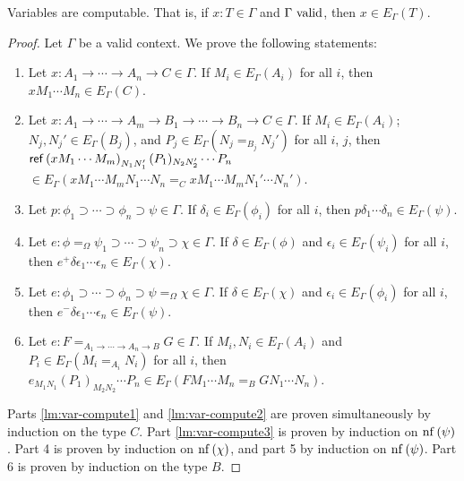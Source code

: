 \begin{lm}
\label{lm:var-compute}
Variables are computable.  That is, if $x : T \in \Gamma$ and $\Gamma \ \mathrm{valid}$, then $x \in E_\Gamma(T)$.
\end{lm}

\begin{proof}
Let $\Gamma$ be a valid context.
We prove the following statements:
\begin{enumerate}
\item
\label{lm:var-compute1}
Let $x : A_1 \rightarrow \cdots \rightarrow A_n \rightarrow C \in \Gamma$.  If $M_i \in E_\Gamma(A_i)$ for all $i$,
then $x M_1 \cdots M_n \in E_\Gamma(C)$.
\item
\label{lm:var-compute2}
Let $x : A_1 \rightarrow \cdots \rightarrow A_m \rightarrow B_1 \rightarrow \cdots \rightarrow B_n \rightarrow C \in \Gamma$.
If $M_i \in E_\Gamma(A_i)$; $N_j, N_j' \in E_\Gamma(B_j)$, and $P_j \in E_\Gamma(N_j =_{B_j} N_j')$ for all $i$, $j$,
then $\mathsf{ref} \left( {x M_1 \cdots M_m} \right)_{N_1 N_1'} (P_1)_{N_2 N_2'} \cdots P_n$ \\ $\in E_\Gamma(x M_1 \cdots M_m N_1 \cdots N_n =_C x M_1 \cdots M_m N_1' \cdots N_n')$.
\item
\label{lm:var-compute3}
Let $p : \phi_1 \supset \cdots \supset \phi_n \supset \psi \in \Gamma$.  If $\delta_i \in E_\Gamma(\phi_i)$ for all $i$,
then $p \delta_1 \cdots \delta_n \in E_\Gamma(\psi)$.
\item
\label{lm:var-compute4}
Let $e : \phi =_\Omega \psi_1 \supset \cdots \supset \psi_n \supset \chi \in \Gamma$.  If $\delta \in E_\Gamma(\phi)$ and $\epsilon_i \in E_\Gamma(\psi_i)$
for all $i$, then $e^+ \delta \epsilon_1 \cdots \epsilon_n \in E_\Gamma(\chi)$.
\item
\label{lm:var-compute5}
Let $e : \phi_1 \supset \cdots \supset \phi_n \supset \psi =_\Omega \chi \in \Gamma$.  If $\delta \in E_\Gamma(\chi)$ and $\epsilon_i \in E_\Gamma(\phi_i)$
for all $i$, then $e^- \delta \epsilon_1 \cdots \epsilon_n \in E_\Gamma(\psi)$.
\item
\label{lm:var-compute6}
Let $e : F =_{A_1 \rightarrow \cdots \rightarrow A_n \rightarrow B} G \in \Gamma$.  If $M_i, N_i \in E_\Gamma(A_i)$ and $P_i \in E_\Gamma(M_i =_{A_i} N_i)$ for all $i$,
then $e_{M_1 N_1} (P_1)_{M_2 N_2} \cdots P_n \in E_\Gamma(F M_1 \cdots M_n =_B G N_1 \cdots N_n)$.
\end{enumerate}
Parts \ref{lm:var-compute1} and \ref{lm:var-compute2} are proven simultaneously by induction on the type $C$.  Part \ref{lm:var-compute3} is
proven by induction on $\mathrm{nf} \left( {\psi} \right)$.  Part 4 is proven by induction on $\mathrm{nf} \left( {\chi} \right)$, and part 5 by induction on $\mathrm{nf} \left( {\psi} \right)$.
Part 6 is proven by induction on the type $B$.
\end{proof}

